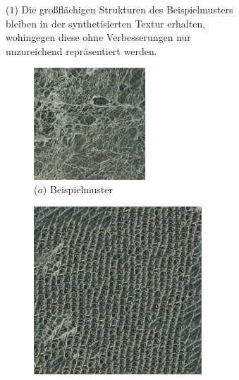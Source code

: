 \begin{figure}
\begin{subfigure}{0.9\textwidth}
	\caption*{($1$) Die großflächigen Strukturen des Beispielmusters bleiben in der synthetisierten Textur erhalten, wohingegen diese ohne Verbesserungen nur unzureichend repräsentiert werden.}
\end{subfigure}
\hfill
\begin{subfigure}{0.9\textwidth}
	\centering
	\begin{subfigure}{0.3\textwidth}
		\centering
		\includegraphics[width=0.6\textwidth]{images/example-2-example}
		\caption*{($a$) Beispielmuster}
	\end{subfigure}
	\hfill
	\begin{subfigure}{0.3\textwidth}
		\centering
		\includegraphics[width=0.9\textwidth]{images/example-2-without}

\end{subfigure}
\end{subfigure}
\end{figure}
